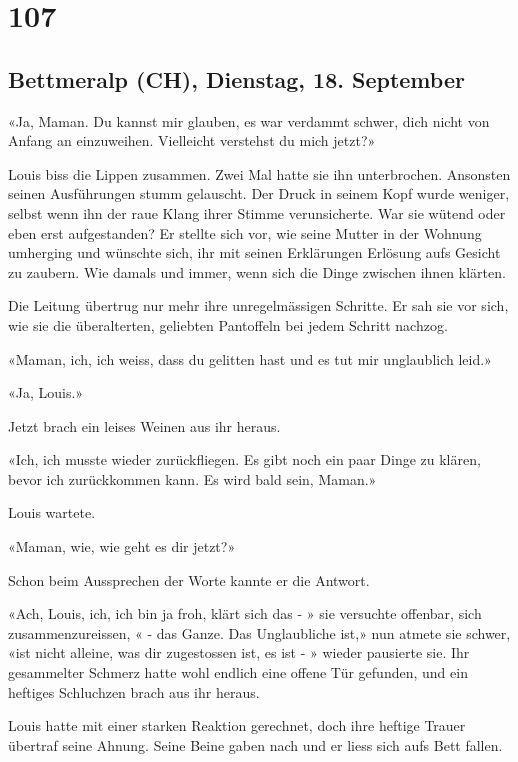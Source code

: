 \chapter{107}

\section{Bettmeralp (CH), Dienstag, 18.
September}



«Ja, Maman. Du kannst mir glauben, es war verdammt schwer, dich nicht
von Anfang an einzuweihen. Vielleicht verstehst du mich jetzt?»

Louis biss die Lippen zusammen. Zwei Mal hatte sie ihn unterbrochen.
Ansonsten seinen Ausführungen stumm gelauscht. Der Druck in seinem Kopf
wurde weniger, selbst wenn ihn der raue Klang ihrer Stimme
verunsicherte. War sie wütend oder eben erst aufgestanden? Er stellte
sich vor, wie seine Mutter in der Wohnung umherging und wünschte sich,
ihr mit seinen Erklärungen Erlösung aufs Gesicht zu zaubern. Wie damals
und immer, wenn sich die Dinge zwischen ihnen klärten.

Die Leitung übertrug nur mehr ihre unregelmässigen Schritte. Er sah sie vor sich, wie sie die überalterten, geliebten 
Pantoffeln bei jedem Schritt nachzog.

«Maman, ich, ich weiss, dass du gelitten hast und es tut mir unglaublich
leid.»

«Ja, Louis.»

Jetzt brach ein leises Weinen aus ihr heraus.

«Ich, ich musste wieder zurückfliegen. Es gibt noch ein paar Dinge zu
klären, bevor ich zurückkommen kann. Es wird bald sein, Maman.»

Louis wartete.

«Maman, wie, wie geht es dir jetzt?»

Schon beim Aussprechen der Worte kannte er die Antwort.

«Ach, Louis, ich, ich bin ja froh, klärt sich das - » sie versuchte
offenbar, sich zusammenzureissen, « - das Ganze. Das Unglaubliche ist,» nun atmete sie schwer, «ist nicht
alleine, was dir zugestossen ist, es ist - » wieder pausierte sie. Ihr
gesammelter Schmerz hatte wohl endlich eine offene Tür gefunden, und ein heftiges Schluchzen 
brach aus ihr heraus.

Louis hatte mit einer starken Reaktion gerechnet, doch ihre heftige
Trauer übertraf seine Ahnung. Seine Beine gaben nach und er liess sich
aufs Bett fallen.

